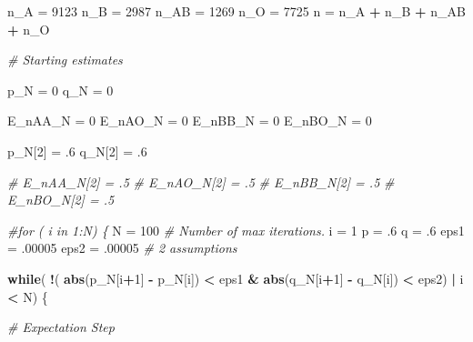\documentclass[]{article}
\newenvironment{Shaded}{\begin{snugshade}}{\end{snugshade}}
\newcommand{\KeywordTok}[1]{\textcolor[rgb]{0.13,0.29,0.53}{\textbf{#1}}}
\newcommand{\DecValTok}[1]{\textcolor[rgb]{0.00,0.00,0.81}{#1}}
\newcommand{\StringTok}[1]{\textcolor[rgb]{0.31,0.60,0.02}{#1}}
\newcommand{\CommentTok}[1]{\textcolor[rgb]{0.56,0.35,0.01}{\textit{#1}}}
\newcommand{\ControlFlowTok}[1]{\textcolor[rgb]{0.13,0.29,0.53}{\textbf{#1}}}
\newcommand{\OperatorTok}[1]{\textcolor[rgb]{0.81,0.36,0.00}{\textbf{#1}}}
\newcommand{\NormalTok}[1]{#1}
\begin{document}
\begin{Shaded}
\begin{Highlighting}[]
\NormalTok{n_A =}\StringTok{ }\DecValTok{9123}
\NormalTok{n_B =}\StringTok{ }\DecValTok{2987}
\NormalTok{n_AB =}\StringTok{ }\DecValTok{1269}
\NormalTok{n_O =}\StringTok{ }\DecValTok{7725}
\NormalTok{n =}\StringTok{ }\NormalTok{n_A }\OperatorTok{+}\StringTok{ }\NormalTok{n_B }\OperatorTok{+}\StringTok{ }\NormalTok{n_AB }\OperatorTok{+}\StringTok{ }\NormalTok{n_O}


\CommentTok{# Starting estimates}

\NormalTok{p_N =}\StringTok{ }\DecValTok{0}
\NormalTok{q_N =}\StringTok{ }\DecValTok{0}
        
\NormalTok{E_nAA_N =}\StringTok{ }\DecValTok{0}
\NormalTok{E_nAO_N =}\StringTok{ }\DecValTok{0}
\NormalTok{E_nBB_N =}\StringTok{ }\DecValTok{0}
\NormalTok{E_nBO_N =}\StringTok{ }\DecValTok{0}

\NormalTok{p_N[}\DecValTok{2}\NormalTok{] =}\StringTok{ }\NormalTok{.}\DecValTok{6}
\NormalTok{q_N[}\DecValTok{2}\NormalTok{] =}\StringTok{ }\NormalTok{.}\DecValTok{6}
        
\CommentTok{# E_nAA_N[2] = .5}
\CommentTok{# E_nAO_N[2] = .5}
\CommentTok{# E_nBB_N[2] = .5}
\CommentTok{# E_nBO_N[2] = .5}

\CommentTok{#for ( i in 1:N) \{}
\NormalTok{N =}\StringTok{ }\DecValTok{100} \CommentTok{# Number of max iterations.}
\NormalTok{i =}\StringTok{ }\DecValTok{1}
\NormalTok{p =}\StringTok{ }\NormalTok{.}\DecValTok{6}
\NormalTok{q =}\StringTok{ }\NormalTok{.}\DecValTok{6}
\NormalTok{eps1 =}\StringTok{ }\NormalTok{.}\DecValTok{00005}
\NormalTok{eps2 =}\StringTok{ }\NormalTok{.}\DecValTok{00005}
\CommentTok{# 2 assumptions }

\ControlFlowTok{while}\NormalTok{( }\OperatorTok{!}\NormalTok{( }\KeywordTok{abs}\NormalTok{(p_N[i}\OperatorTok{+}\DecValTok{1}\NormalTok{] }\OperatorTok{-}\StringTok{ }\NormalTok{p_N[i]) }\OperatorTok{<}\StringTok{ }\NormalTok{eps1 }\OperatorTok{&}\StringTok{ }\KeywordTok{abs}\NormalTok{(q_N[i}\OperatorTok{+}\DecValTok{1}\NormalTok{] }\OperatorTok{-}\StringTok{ }\NormalTok{q_N[i]) }\OperatorTok{<}\StringTok{ }\NormalTok{eps2) }\OperatorTok{|}\StringTok{ }\NormalTok{i }\OperatorTok{<}\StringTok{ }\NormalTok{N) \{ }
      
        \CommentTok{# Expectation Step}
      

\end{Highlighting}
\end{Shaded}
\end{document}
